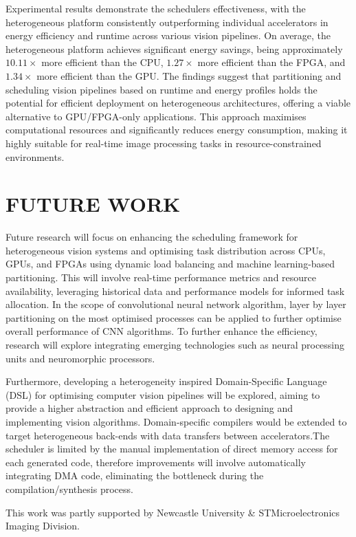 \documentclass[]{spie}  %
\begin{document}
Experimental results demonstrate the schedulers effectiveness, with the heterogeneous platform consistently outperforming individual accelerators in energy efficiency and runtime across various vision pipelines. On average, the heterogeneous platform achieves significant energy savings, being approximately \(10.11\times\) more efficient than the CPU, \(1.27\times\) more efficient than the FPGA, and \(1.34\times\) more efficient than the GPU. The findings suggest that partitioning and scheduling vision pipelines based on runtime and energy profiles holds the potential for efficient deployment on heterogeneous architectures, offering a viable alternative to GPU/FPGA-only applications. This approach maximises computational resources and significantly reduces energy consumption, making it highly suitable for real-time image processing tasks in resource-constrained environments.


\section{FUTURE WORK}
\label{sec:future work}

Future research will focus on enhancing the scheduling framework for heterogeneous vision systems and optimising task distribution across CPUs, GPUs, and FPGAs using dynamic load balancing and machine learning-based partitioning. This will involve real-time performance metrics and resource availability, leveraging historical data and performance models for informed task allocation. In the scope of convolutional neural network algorithm, layer by layer partitioning on the most optimised processes can be applied to further optimise overall performance of CNN algorithms. To further enhance the efficiency, research will explore integrating emerging technologies such as neural processing units and neuromorphic processors. 

Furthermore, developing a heterogeneity inspired Domain-Specific Language (DSL) for optimising computer vision pipelines will be explored, aiming to provide a higher abstraction and efficient approach to designing and implementing vision algorithms. Domain-specific compilers would be extended to target heterogeneous back-ends with data transfers between accelerators.The scheduler is limited by the manual implementation of direct memory access for each generated code, therefore improvements will involve automatically integrating DMA code, eliminating the bottleneck during the compilation/synthesis process.









\acknowledgments %
 
This work was partly supported by Newcastle University \& STMicroelectronics Imaging Division.

\end{document}
